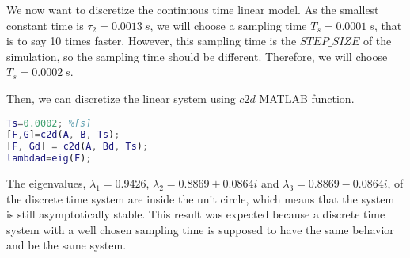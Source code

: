We now want to discretize the continuous time linear model. As the smallest constant time is $\tau_2=0.0013\ s$, we will choose a sampling time $T_s=0.0001\ s$, that is to say 10 times faster. However, this sampling time is the $STEP\_SIZE$ of the simulation, so the sampling time should be different. Therefore, we will choose $T_s=0.0002\ s$.

Then, we can discretize the linear system using $c2d$ MATLAB function.

\begin{lstlisting}[language=Matlab]
Ts=0.0002; %[s]
[F,G]=c2d(A, B, Ts);
[F, Gd] = c2d(A, Bd, Ts);
lambdad=eig(F);
\end{lstlisting}

The eigenvalues, $\lambda_1=0.9426$, $\lambda_2=0.8869+0.0864i$ and $\lambda_3=0.8869-0.0864i$, of the discrete time system are inside the unit circle, which means that the system is still asymptotically stable. This result was expected because a discrete time system with a well chosen sampling time is supposed to have the same behavior and be the same system.